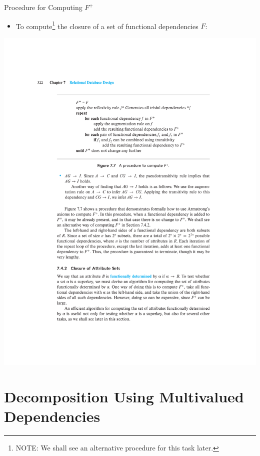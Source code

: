 \documentclass{beamer}
\begin{document}
\begin{frame}{Procedure for Computing $F^+$}
    \begin{itemize}
        \item To compute\footnote{NOTE: We shall see an alternative procedure for this task later.} the closure of a set of functional dependencies $F$:
    \end{itemize}
    \centering
    \includegraphics[width=\textwidth, trim={4cm 16.5cm 4cm 4.5cm}, clip]{figures/p322_Fplus_procedure}
\end{frame}

\section{Decomposition Using Multivalued Dependencies}
\end{document}
